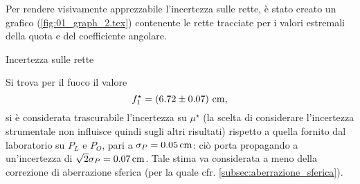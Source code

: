 Per rendere visivamente apprezzabile l'incertezza sulle rette, \`e stato creato un grafico (\autoref{fig:01_graph_2.tex}) contenente le rette tracciate per i valori estremali della quota e del coefficiente angolare.
\begin{grafico} \centering  \caption{Incertezza sulle rette} \label{fig:01_graph_2.tex} \end{grafico}

Si trova per il fuoco il valore 
\[ f^{\star}_1=\left(6.72 \pm 0.07\right) \,\mathrm{cm} , \] 
si \`e considerata trascurabile l'incertezza su $\mu^{\star}$ (la scelta di considerare l'incertezza strumentale non influisce quindi sugli altri risultati) rispetto a quella fornito dal laboratorio su $P_L$ e $P_O$, pari a $\sigma _P = 0.05 \,\mathrm{cm}$: ci\`o porta propagando a un'incertezza di $\sqrt{2}   \sigma_P = 0.07 \,\mathrm{cm}$. Tale stima va considerata a meno della correzione di aberrazione sferica (per la quale cfr. \autoref{subsec:aberrazione_sferica}).

